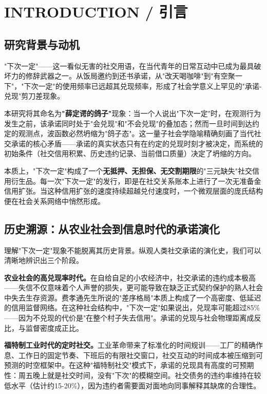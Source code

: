 \documentclass[journal]{IEEEtran}
\newcommand{\citet}[1]{\cite{#1}}
\begin{document}
\IEEEpeerreviewmaketitle

\section{INTRODUCTION / 引言}

\subsection{研究背景与动机}

"下次一定"——这一看似无害的社交用语，在当代青年的日常互动中已成为最具破坏力的修辞武器之一。从饭局邀约到还书承诺，从"改天喝咖啡"到"有空聚一下"，"下次一定"的使用频率已远超其兑现频率，形成了社会学意义上罕见的"承诺-兑现"剪刀差现象\citet{pigeon_linguistics}。

本研究将其命名为\textbf{"薛定谔的鸽子"}现象：当一个人说出"下次一定"时，在观测行为发生之前，该承诺同时处于"会兑现"和"不会兑现"的叠加态；然而一旦时间到达约定的观测点，波函数必然坍缩为"鸽子态"。这一量子社会学隐喻精确刻画了当代社交承诺的核心矛盾——承诺的真实状态只有在约定的兑现时刻才被决定，而系统的初始条件（社交信用积累、历史违约记录、当前借口质量）决定了坍缩的方向\citet{schrodinger_vs_pigeon}。

本质上，"下次一定"构成了一个\textbf{无抵押、无担保、无交割期限}的"三元缺失"社交信用衍生品\citet{ponzi_social}。每一次"下次一定"的发行，即是在社交关系账本上进行了一次无准备金信用扩张。当这种信用扩张的速度持续超越兑付速度时，一个微观层面的庞氏结构便在社会关系网络中悄然形成。

\subsection{历史溯源：从农业社会到信息时代的承诺演化}

理解"下次一定"现象不能脱离其历史背景。纵观人类社交承诺的演化史，我们可以清晰地辨识出三个阶段。

\textbf{农业社会的高兑现率时代。}在自给自足的小农经济中，社交承诺的违约成本极高——失信不仅意味着个人声誉的损失，更可能导致在缺乏正式契约保护的熟人社会中失去生存资源。费孝通先生所说的"差序格局"\citet{guanxi}本质上构成了一个高密度、低延迟的信用监督网络。在这种社会结构中，"下次一定"如果说出，兑现率可能超过85\%——因为不兑现的代价是"在整个村子失去信用"。承诺的兑现与社会物理距离成反比，与监督密度成正比。

\textbf{福特制工业时代的定时社交。}工业革命带来了标准化的时间规训——工厂的精确作息、工作日的固定节奏、下班后的有限社交窗口，社交互动的时间成本被压缩到可预测的时空框架中。在这种"福特制社交"模式下，承诺的兑现具有高度的可预期性：周五晚上就是社交时间，没有"下次"的模糊空间。社交债务的违约率维持在较低水平（估计约15-20\%），因为违约者需要面对面地向同事解释其缺席的合理性。
\end{document}
